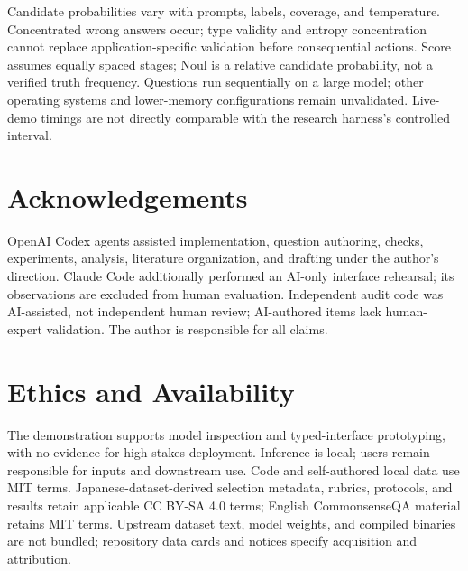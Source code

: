 \documentclass[11pt]{article}
\begin{document}
Candidate probabilities vary with prompts, labels, coverage, and temperature. Concentrated wrong answers occur; type validity and entropy concentration cannot replace application-specific validation before consequential actions. Score assumes equally spaced stages; Noul is a relative candidate probability, not a verified truth frequency. Questions run sequentially on a large model; other operating systems and lower-memory configurations remain unvalidated. Live-demo timings are not directly comparable with the research harness's controlled interval.

\section*{Acknowledgements}
OpenAI Codex agents assisted implementation, question authoring, checks, experiments, analysis, literature organization, and drafting under the author's direction. Claude Code additionally performed an AI-only interface rehearsal; its observations are excluded from human evaluation. Independent audit code was AI-assisted, not independent human review; AI-authored items lack human-expert validation. The author is responsible for all claims.

\clearpage
\section*{Ethics and Availability}
The demonstration supports model inspection and typed-interface prototyping, with no evidence for high-stakes deployment. Inference is local; users remain responsible for inputs and downstream use. Code and self-authored local data use MIT terms. Japanese-dataset-derived selection metadata, rubrics, protocols, and results retain applicable CC BY-SA 4.0 terms; English CommonsenseQA material retains MIT terms. Upstream dataset text, model weights, and compiled binaries are not bundled; repository data cards and notices specify acquisition and attribution.
\end{document}
